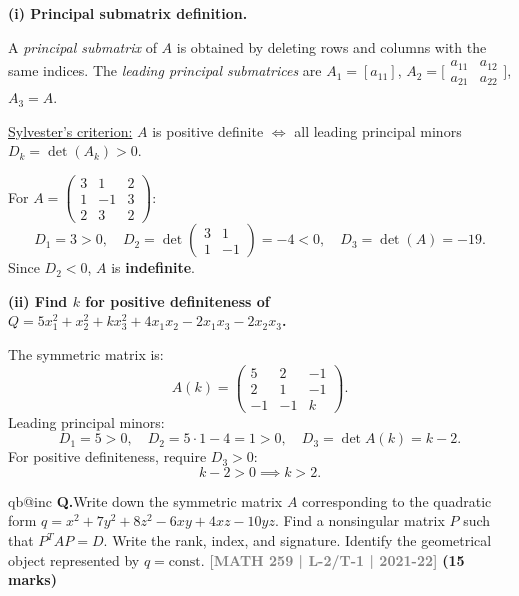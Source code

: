 \documentclass[12pt,a3paper]{article}
\makeatletter
\newcommand{\yr}[1]{\hfill\textcolor{gray}{\small\textbf{[#1]}}}
\newcommand{\mk}[1]{\textcolor{orange!70!black}{\small\textbf{(#1 marks)}}}
\newcounter{qnum}
\newcommand{\Q}[1]{%
  \csname qb@inc\endcsname
  \needspace{4\baselineskip}
  \refstepcounter{qnum}
  \vspace{6pt}
  \noindent\textbf{Q\theqnum.}\enspace #1\par
}
\makeatother
\begin{document}
\begin{tcolorbox}[enhanced,breakable,
  colback=cE!4,colframe=cE,boxrule=0.8pt,arc=5pt,
  title={\textbf{Answer --- Principal Submatrices \& Positive Definiteness}},
  fonttitle=\bfseries\color{white},colbacktitle=cE]

\textbf{(i) Principal submatrix definition.}

A \emph{principal submatrix} of $A$ is obtained by deleting rows and columns with the same indices. The \emph{leading principal submatrices} are $A_1=[a_{11}]$, $A_2=\bigl[\begin{smallmatrix}a_{11}&a_{12}\\a_{21}&a_{22}\end{smallmatrix}\bigr]$, $A_3=A$.

\underline{Sylvester's criterion:} $A$ is positive definite $\Leftrightarrow$ all leading principal minors $D_k=\det(A_k)>0$.

For $A=\begin{pmatrix}3&1&2\\1&-1&3\\2&3&2\end{pmatrix}$:
\[
D_1=3>0,\quad D_2=\det\begin{pmatrix}3&1\\1&-1\end{pmatrix}=-4<0,\quad D_3=\det(A)=-19.
\]
Since $D_2<0$, $A$ is \textbf{indefinite}.

\medskip
\textbf{(ii) Find $k$ for positive definiteness of $Q=5x_1^2+x_2^2+kx_3^2+4x_1x_2-2x_1x_3-2x_2x_3$.}

The symmetric matrix is:
\[
A(k)=\begin{pmatrix}5&2&-1\\2&1&-1\\-1&-1&k\end{pmatrix}.
\]
Leading principal minors:
\[
D_1=5>0,\quad D_2=5\cdot1-4=1>0,\quad D_3=\det A(k)=k-2.
\]
For positive definiteness, require $D_3>0$:
\[
k-2>0\implies\boxed{k>2.}
\]

\end{tcolorbox}

\Q{Write down the symmetric matrix $A$ corresponding to the quadratic form $q = x^2 + 7y^2 + 8z^2 - 6xy + 4xz - 10yz$. Find a nonsingular matrix $P$ such that $P^TAP = D$. Write the rank, index, and signature. Identify the geometrical object represented by $q = \text{const}$.
\yr{MATH 259 | L-2/T-1 | 2021-22} \mk{15}}
\end{document}
